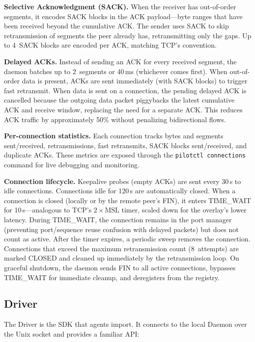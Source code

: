 \documentclass[11pt,a4paper]{article}
\begin{document}
\textbf{Selective Acknowledgment (SACK).} When the receiver has out-of-order segments, it encodes SACK blocks in the ACK payload---byte ranges that have been received beyond the cumulative ACK. The sender uses SACK to skip retransmission of segments the peer already has, retransmitting only the gaps. Up to 4~SACK blocks are encoded per ACK, matching TCP's convention.

\textbf{Delayed ACKs.} Instead of sending an ACK for every received segment, the daemon batches up to 2~segments or 40\,ms (whichever comes first). When out-of-order data is present, ACKs are sent immediately (with SACK blocks) to trigger fast retransmit. When data is sent on a connection, the pending delayed ACK is cancelled because the outgoing data packet piggybacks the latest cumulative ACK and receive window, replacing the need for a separate ACK. This reduces ACK traffic by approximately 50\% without penalizing bidirectional flows.

\textbf{Per-connection statistics.} Each connection tracks bytes and segments sent/received, retransmissions, fast retransmits, SACK blocks sent/received, and duplicate ACKs. These metrics are exposed through the \texttt{pilotctl connections} command for live debugging and monitoring.

\textbf{Connection lifecycle.} Keepalive probes (empty ACKs) are sent every 30\,s to idle connections. Connections idle for 120\,s are automatically closed. When a connection is closed (locally or by the remote peer's FIN), it enters TIME\_WAIT for 10\,s---analogous to TCP's $2 \times \text{MSL}$ timer, scaled down for the overlay's lower latency. During TIME\_WAIT, the connection remains in the port manager (preventing port/sequence reuse confusion with delayed packets) but does not count as active. After the timer expires, a periodic sweep removes the connection. Connections that exceed the maximum retransmission count (8~attempts) are marked CLOSED and cleaned up immediately by the retransmission loop. On graceful shutdown, the daemon sends FIN to all active connections, bypasses TIME\_WAIT for immediate cleanup, and deregisters from the registry.

\subsection{Driver}

The Driver is the SDK that agents import. It connects to the local Daemon over the Unix socket and provides a familiar API:
\end{document}

